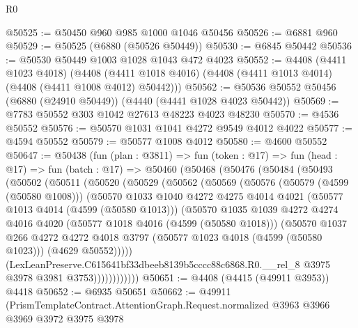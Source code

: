 \begin{lexlean}{R0}
\begin{coremodule}
@50525 := @50450 @960 @985 @1000 @1046 @50456
@50526 := @6881 @960
@50529 := @50525 (@6880 (@50526 @50449))
@50530 := @6845 @50442
@50536 := @50530 @50449 @1003 @1028 @1043 @472 @4023
@50552 := @4408
    (@4411 @1023 @4018)
    (@4408 (@4411 @1018 @4016) (@4408 (@4411 @1013 @4014) (@4408 (@4411 @1008 @4012) @50442)))
@50562 := @50536 @50552 @50456 (@6880 (@24910 @50449)) (@4440 (@4441 @1028 @4023 @50442))
@50569 := @7783 @50552 @303 @1042 @27613 @48223 @4023 @48230
@50570 := @4536 @50552
@50576 := @50570 @1031 @1041 @4272 @9549 @4012 @4022
@50577 := @4594 @50552
@50579 := @50577 @1008 @4012
@50580 := @4600 @50552
@50647 := @50438
    (fun (plan : @3811) =>
    fun (token : @17) =>
    fun (head : @17) =>
    fun (batch : @17) =>
    @50460
      (@50468
        (@50476
          (@50484
            (@50493
              (@50502
                (@50511
                  (@50520
                    (@50529
                      (@50562
                        (@50569
                          (@50576
                            (@50579 (@4599 (@50580 @1008)))
                            (@50570
                              @1033
                              @1040
                              @4272
                              @4275
                              @4014
                              @4021
                              (@50577 @1013 @4014 (@4599 (@50580 @1013)))
                              (@50570
                                @1035
                                @1039
                                @4272
                                @4274
                                @4016
                                @4020
                                (@50577 @1018 @4016 (@4599 (@50580 @1018)))
                                (@50570
                                  @1037
                                  @266
                                  @4272
                                  @4272
                                  @4018
                                  @3797
                                  (@50577 @1023 @4018 (@4599 (@50580 @1023)))
                                  (@4629 @50552)))))
                          (LexLeanPreserve.C615641bf33dbeeb8139b5cccc88c6868.R0.__rel_8
                            @3975
                            @3978
                            @3981
                            @3753))))))))))))
@50651 := @4408 (@4415 (@49911 @3953)) @4418
@50652 := @6935 @50651
@50662 := @49911
    (PrismTemplateContract.AttentionGraph.Request.normalized
      @3963
      @3966
      @3969
      @3972
      @3975
      @3978

\end{coremodule}
\end{lexlean}
